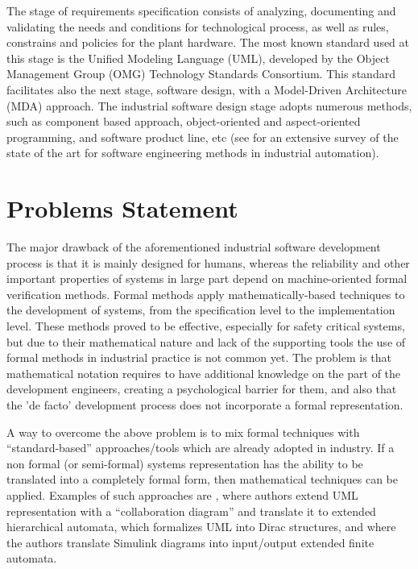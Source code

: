 The stage of requirements specification consists of analyzing, documenting and
validating the needs and conditions for technological process, as well as rules,
constrains and policies for the plant hardware. The most known standard used at
this stage is the Unified Modeling Language (UML), developed by the Object
Management Group (OMG) Technology Standards Consortium. This standard
facilitates also the next stage, software design, with a Model-Driven
Architecture (MDA) approach. The industrial software design stage adopts
numerous methods, such as component based approach, object-oriented and
aspect-oriented programming, and software product line, etc (see
\cite{vyatkin_software_2013} for an extensive survey of the state of the art for
software engineering methods in industrial automation).

\section*{Problems Statement}

The major drawback of the aforementioned industrial software
development process is that it is mainly designed for humans, whereas the
reliability and other important properties of systems in large part depend on
machine-oriented formal verification methods. Formal methods apply
mathematically-based techniques to the development of systems, from the
specification level to the implementation level. These methods proved
to be effective, especially for safety critical systems, but due to their
mathematical nature and lack of the supporting tools the use of formal methods
in industrial practice is not common yet. The problem is that mathematical
notation requires to have additional knowledge on the part of the development
engineers, creating a psychological barrier for them, and also that the 'de
facto' development process does not incorporate a formal representation.

A way to overcome the above problem is to mix formal techniques with
``standard-based'' approaches/tools which are already adopted in industry. If
a non formal (or semi-formal) systems representation has the ability to be
translated into a completely formal form, then mathematical techniques can be
applied. Examples of such approaches are \cite{dong_model_2001}, where authors
extend UML representation with a ``collaboration diagram'' and translate it to
extended hierarchical automata, \cite{secchi_use_2007} which formalizes UML
into Dirac structures, and \cite{zhou_semantic_2012} where the authors
translate Simulink diagrams into input/output extended finite automata.

